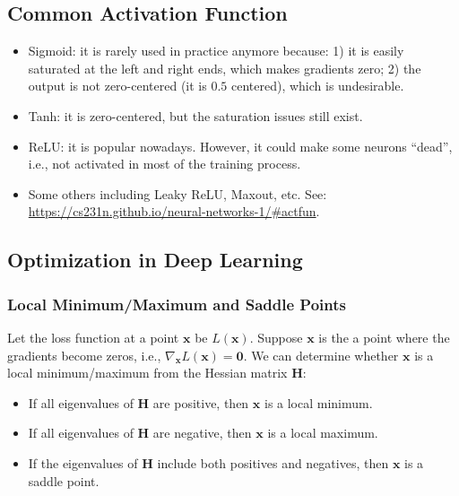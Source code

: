 \subsection{Common Activation Function}
    \begin{itemize}
        \item Sigmoid: it is rarely used in practice anymore because: 1) it is easily saturated at the left and right ends, which makes gradients zero; 2) the output is not zero-centered (it is $0.5$ centered), which is undesirable.
        \item Tanh: it is zero-centered, but the saturation issues still exist.
        \item ReLU: it is popular nowadays. However, it could make some neurons ``dead'', i.e., not activated in most of the training process.
        \item Some others including Leaky ReLU, Maxout, etc. See: \url{https://cs231n.github.io/neural-networks-1/#actfun}.
    \end{itemize}


\subsection{Optimization in Deep Learning}
    \subsubsection{Local Minimum/Maximum and Saddle Points}
    Let the loss function at a point $\bm{x}$ be $L(\bm{x})$.
    Suppose $\bm{x}$ is the a point where the gradients become zeros, i.e., $\nabla_{\bm{x}}L(\bm{x}) = \bm{0}$.
    We can determine whether $\bm{x}$ is a local minimum/maximum from the Hessian matrix $\bm{H}$:
        \begin{itemize}
            \item If all eigenvalues of $\bm{H}$ are positive, then $\bm{x}$ is a local minimum.
            \item If all eigenvalues of $\bm{H}$ are negative, then $\bm{x}$ is a local maximum.
            \item If the eigenvalues of $\bm{H}$ include both positives and negatives, then $\bm{x}$ is a saddle point.
        \end{itemize}
        
